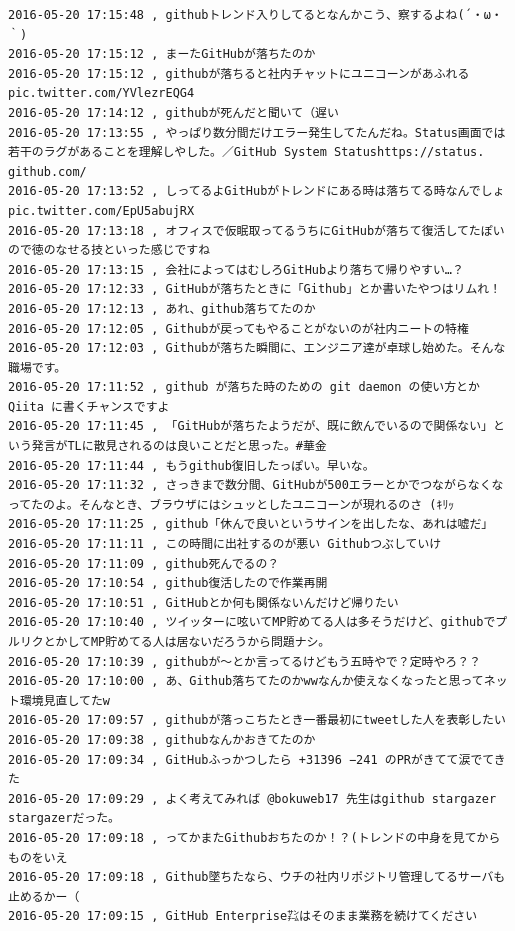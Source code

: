 \begin{verbatim}
2016-05-20 17:15:48 , githubトレンド入りしてるとなんかこう、察するよね(´・ω・｀)
2016-05-20 17:15:12 , まーたGitHubが落ちたのか
2016-05-20 17:15:12 , githubが落ちると社内チャットにユニコーンがあふれる pic.twitter.com/YVlezrEQG4
2016-05-20 17:14:12 , githubが死んだと聞いて（遅い
2016-05-20 17:13:55 , やっぱり数分間だけエラー発生してたんだね。Status画面では若干のラグがあることを理解しやした。／GitHub System Statushttps://status.
github.com/ 
2016-05-20 17:13:52 , しってるよGitHubがトレンドにある時は落ちてる時なんでしょ pic.twitter.com/EpU5abujRX
2016-05-20 17:13:18 , オフィスで仮眠取ってるうちにGitHubが落ちて復活してたぽいので徳のなせる技といった感じですね
2016-05-20 17:13:15 , 会社によってはむしろGitHubより落ちて帰りやすい…？
2016-05-20 17:12:33 , GitHubが落ちたときに「Github」とか書いたやつはリムれ！
2016-05-20 17:12:13 , あれ、github落ちてたのか
2016-05-20 17:12:05 , Githubが戻ってもやることがないのが社内ニートの特権
2016-05-20 17:12:03 , Githubが落ちた瞬間に、エンジニア達が卓球し始めた。そんな職場です。
2016-05-20 17:11:52 , github が落ちた時のための git daemon の使い方とか Qiita に書くチャンスですよ
2016-05-20 17:11:45 , 「GitHubが落ちたようだが、既に飲んでいるので関係ない」という発言がTLに散見されるのは良いことだと思った。#華金
2016-05-20 17:11:44 , もうgithub復旧したっぽい。早いな。
2016-05-20 17:11:32 , さっきまで数分間、GitHubが500エラーとかでつながらなくなってたのよ。そんなとき、ブラウザにはシュッとしたユニコーンが現れるのさ (ｷﾘｯ
2016-05-20 17:11:25 , github「休んで良いというサインを出したな、あれは嘘だ」
2016-05-20 17:11:11 , この時間に出社するのが悪い Githubつぶしていけ
2016-05-20 17:11:09 , github死んでるの？
2016-05-20 17:10:54 , github復活したので作業再開
2016-05-20 17:10:51 , GitHubとか何も関係ないんだけど帰りたい
2016-05-20 17:10:40 , ツイッターに呟いてMP貯めてる人は多そうだけど、githubでプルリクとかしてMP貯めてる人は居ないだろうから問題ナシ。
2016-05-20 17:10:39 , githubが〜とか言ってるけどもう五時やで？定時やろ？？
2016-05-20 17:10:00 , あ、Github落ちてたのかwwなんか使えなくなったと思ってネット環境見直してたw
2016-05-20 17:09:57 , githubが落っこちたとき一番最初にtweetした人を表彰したい
2016-05-20 17:09:38 , githubなんかおきてたのか
2016-05-20 17:09:34 , GitHubふっかつしたら +31396 −241 のPRがきてて涙でてきた
2016-05-20 17:09:29 , よく考えてみれば @bokuweb17 先生はgithub stargazer 
stargazerだった。
2016-05-20 17:09:18 , ってかまたGithubおちたのか！？(トレンドの中身を見てからものをいえ
2016-05-20 17:09:18 , Github墜ちたなら、ウチの社内リポジトリ管理してるサーバも止めるかー（
2016-05-20 17:09:15 , GitHub Enterprise㌠はそのまま業務を続けてください

\end{verbatim}
